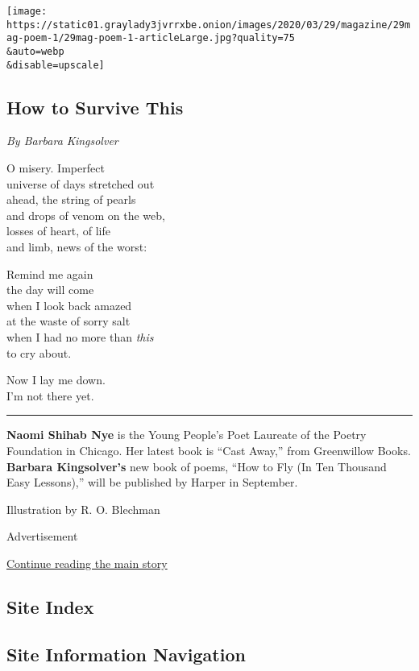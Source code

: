 \texttt{[image: https://static01.graylady3jvrrxbe.onion/images/2020/03/29/magazine/29mag-poem-1/29mag-poem-1-articleLarge.jpg?quality=75\\\&auto=webp\\\&disable=upscale]}

\hypertarget{how-to-survive-this}{%
\subsection{How to Survive This}\label{how-to-survive-this}}

\emph{By Barbara Kingsolver}

O misery. Imperfect\\
universe of days stretched out\\
ahead, the string of pearls\\
and drops of venom on the web,\\
losses of heart, of life\\
and limb, news of the worst:

Remind me again\\
the day will come\\
when I look back amazed\\
at the waste of sorry salt\\
when I had no more than \emph{this}\\
to cry about.

Now I lay me down.\\
I'm not there yet.

\begin{center}\rule{0.5\linewidth}{\linethickness}\end{center}

\textbf{Naomi Shihab Nye} is the Young People's Poet Laureate of the
Poetry Foundation in Chicago. Her latest book is ``Cast Away,'' from
Greenwillow Books. \textbf{Barbara Kingsolver's} new book of poems,
``How to Fly (In Ten Thousand Easy Lessons),'' will be published by
Harper in September.

Illustration by R. O. Blechman

Advertisement

\protect\hyperlink{after-bottom}{Continue reading the main story}

\hypertarget{site-index}{%
\subsection{Site Index}\label{site-index}}

\hypertarget{site-information-navigation}{%
\subsection{Site Information
Navigation}\label{site-information-navigation}}

